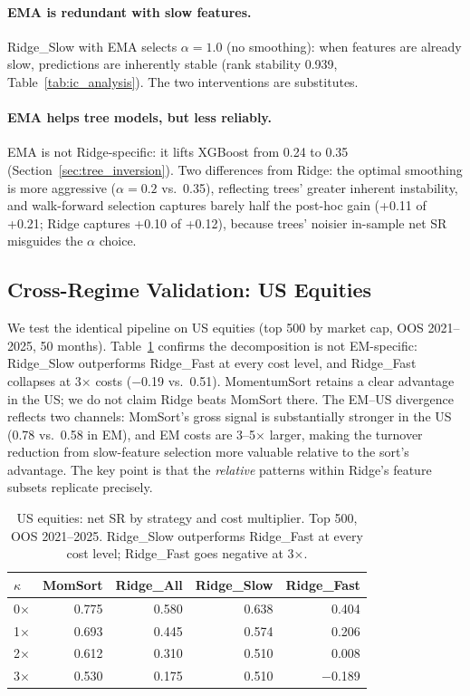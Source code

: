 \documentclass[sigconf,review,anonymous,balance=false]{acmart}
\begin{document}
\paragraph{EMA is redundant with slow features.}
Ridge\_Slow with EMA selects $\alpha = 1.0$ (no smoothing): when
features are already slow, predictions are inherently stable
(rank stability 0.939, Table~\ref{tab:ic_analysis}). The two
interventions are substitutes.

\paragraph{EMA helps tree models, but less reliably.}
EMA is not Ridge-specific: it lifts XGBoost from 0.24 to 0.35
(Section~\ref{sec:tree_inversion}). Two differences from Ridge: the
optimal smoothing is more aggressive ($\alpha = 0.2$ vs.\ 0.35),
reflecting trees' greater inherent instability, and walk-forward
selection captures barely half the post-hoc gain (+0.11 of +0.21;
Ridge captures +0.10 of +0.12), because trees' noisier in-sample
net SR misguides the $\alpha$ choice.


\subsection{Cross-Regime Validation: US Equities}
\label{sec:us_validation}

We test the identical pipeline on US equities (top 500 by market cap,
OOS 2021--2025, 50 months). Table~\ref{tab:us_validation} confirms
the decomposition is not EM-specific: Ridge\_Slow outperforms Ridge\_Fast
at every cost level, and Ridge\_Fast collapses at 3$\times$ costs
($-$0.19 vs.\ 0.51). MomentumSort retains a clear advantage in the
US; we do not claim Ridge beats
MomSort there. The EM--US divergence reflects two channels:
MomSort's gross signal is substantially stronger in the US (0.78 vs.\
0.58 in EM), and EM costs are 3--5$\times$ larger, making the turnover
reduction from slow-feature selection more valuable relative to the
sort's advantage. The key point is that the \emph{relative} patterns
within Ridge's feature subsets replicate precisely.

\begin{table}[t]
\centering
\caption{US equities: net SR by strategy and cost multiplier. Top 500,
OOS 2021--2025. Ridge\_Slow outperforms Ridge\_Fast at every cost
level; Ridge\_Fast goes negative at 3$\times$.}
\label{tab:us_validation}
\small
\begin{tabular}{@{}lrrrr@{}}
\toprule
$\kappa$ & MomSort & Ridge\_All & Ridge\_Slow & Ridge\_Fast \\
\midrule
0$\times$ & 0.775 & 0.580 & 0.638 & 0.404 \\
1$\times$ & 0.693 & 0.445 & 0.574 & 0.206 \\
2$\times$ & 0.612 & 0.310 & 0.510 & 0.008 \\
3$\times$ & 0.530 & 0.175 & 0.510 & $-$0.189 \\
\bottomrule
\end{tabular}
\end{table}
\end{document}
